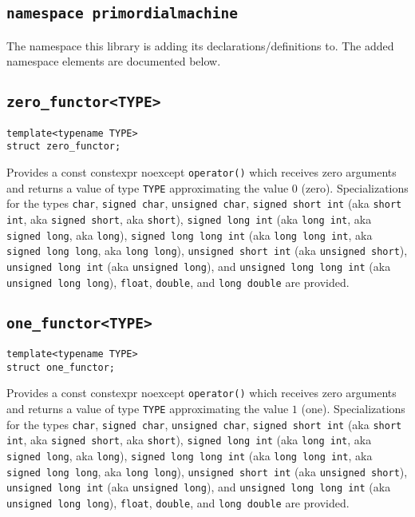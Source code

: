 \documentclass[oneside]{article}
\begin{document}
\subsection{\texttt{namespace primordialmachine}}
The namespace this library is adding its declarations/definitions to.
The added namespace elements are documented below.

\subsection{\texttt{zero\_functor<TYPE>}}
\begin{verbatim}
template<typename TYPE>
struct zero_functor;
\end{verbatim}
Provides a const constexpr noexcept \texttt{operator()} which receives zero arguments and returns a
value of type \texttt{TYPE} approximating the value $0$ (zero).
Specializations for the types
\texttt{char},
\texttt{signed char},
\texttt{unsigned char},
\texttt{signed short int}       (aka \texttt{short int},     aka \texttt{signed short},     aka \texttt{short}),
\texttt{signed long int}        (aka \texttt{long int},      aka \texttt{signed long},      aka \texttt{long}),
\texttt{signed long long int}   (aka \texttt{long long int}, aka \texttt{signed long long}, aka \texttt{long long}),
\texttt{unsigned short int}     (aka \texttt{unsigned short}),
\texttt{unsigned long int}      (aka \texttt{unsigned long}), and
\texttt{unsigned long long int} (aka \texttt{unsigned long long}),
\texttt{float},
\texttt{double}, and
\texttt{long double}
are provided.

\subsection{\texttt{one\_functor<TYPE>}}
\begin{verbatim}
template<typename TYPE>
struct one_functor;
\end{verbatim}
Provides a const constexpr noexcept \texttt{operator()} which receives zero arguments and returns a
value of type \texttt{TYPE} approximating the value $1$ (one).
Specializations for the types
\texttt{char},
\texttt{signed char},
\texttt{unsigned char},
\texttt{signed short int}       (aka \texttt{short int},     aka \texttt{signed short},     aka \texttt{short}),
\texttt{signed long int}        (aka \texttt{long int},      aka \texttt{signed long},      aka \texttt{long}),
\texttt{signed long long int}   (aka \texttt{long long int}, aka \texttt{signed long long}, aka \texttt{long long}),
\texttt{unsigned short int}     (aka \texttt{unsigned short}),
\texttt{unsigned long int}      (aka \texttt{unsigned long}), and
\texttt{unsigned long long int} (aka \texttt{unsigned long long}),
\texttt{float},
\texttt{double}, and
\texttt{long double}
are provided.
\end{document}
